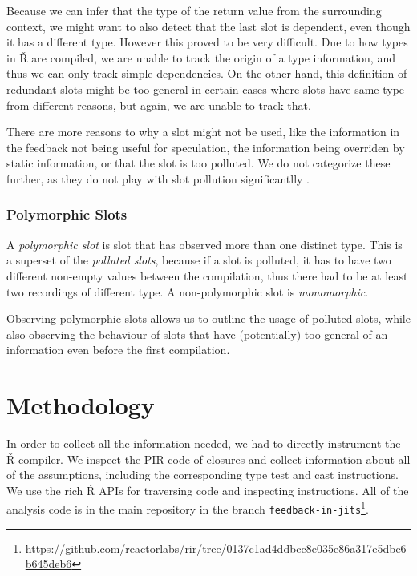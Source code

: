 Because we can infer that the type of the return value from the surrounding context, we might want to also detect that the last slot is dependent, even though it has a different type. However this proved to be very difficult. Due to how types in Ř are compiled, we are unable to track the origin of a type information, and thus we can only track simple dependencies. On the other hand, this definition of redundant slots might be too general in certain cases where slots have same type from different reasons, but again, we are unable to track that. 

There are more reasons to why a slot might not be used, like the information in the feedback not being useful for speculation, the information being overriden by static information, or that the slot is too polluted. We do not categorize these further, as they do not play with slot pollution significantlly .

\subsubsection*{Polymorphic Slots}

A \textit{polymorphic slot} is slot that has observed more than one distinct type. This is a superset of the \textit{polluted slots}, because if a slot is polluted, it has to have two different non-empty values between the compilation, thus there had to be at least two recordings of different type. A non-polymorphic slot is \textit{monomorphic}.

Observing polymorphic slots allows us to outline the usage of polluted slots, while also observing the behaviour of slots that have (potentially) too general of an information even before the first compilation.

\section{Methodology}

In order to collect all the information needed, we had to directly instrument the Ř compiler. We inspect the PIR code of closures and collect information about all of the assumptions, including the corresponding type test and cast instructions. We use the rich Ř APIs for traversing code and inspecting instructions. All of the analysis code is in the main repository in the branch \texttt{feedback-in-jits}\footnote{\url{https://github.com/reactorlabs/rir/tree/0137c1ad4ddbcc8e035e86a317e5dbe6b645deb6}}.

